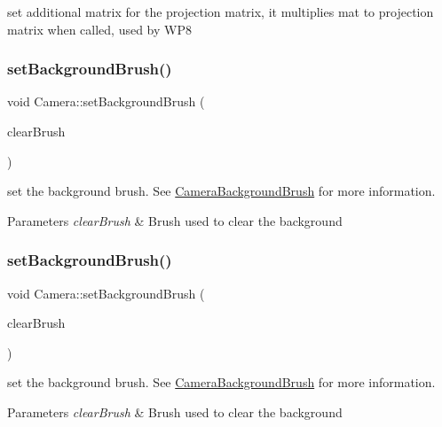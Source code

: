 set additional matrix for the projection matrix, it multiplies mat to projection matrix when called, used by W\+P8 \mbox{\label{classCamera_a1804790d419a1d952752f81680d98d1f}} 
\subsubsection{\texorpdfstring{set\+Background\+Brush()}{setBackgroundBrush()}\hspace{0.1cm}{\footnotesize\ttfamily [1/2]}}
{\footnotesize\ttfamily void Camera\+::set\+Background\+Brush (\begin{DoxyParamCaption}\item[{\hyperlink{classCameraBackgroundBrush}{Camera\+Background\+Brush} $\ast$}]{clear\+Brush }\end{DoxyParamCaption})}

set the background brush. See \hyperlink{classCameraBackgroundBrush}{Camera\+Background\+Brush} for more information. 
\begin{DoxyParams}{Parameters}
{\em clear\+Brush} & Brush used to clear the background \\
\hline
\end{DoxyParams}
\mbox{\label{classCamera_a1804790d419a1d952752f81680d98d1f}} 
\subsubsection{\texorpdfstring{set\+Background\+Brush()}{setBackgroundBrush()}\hspace{0.1cm}{\footnotesize\ttfamily [2/2]}}
{\footnotesize\ttfamily void Camera\+::set\+Background\+Brush (\begin{DoxyParamCaption}\item[{\hyperlink{classCameraBackgroundBrush}{Camera\+Background\+Brush} $\ast$}]{clear\+Brush }\end{DoxyParamCaption})}

set the background brush. See \hyperlink{classCameraBackgroundBrush}{Camera\+Background\+Brush} for more information. 
\begin{DoxyParams}{Parameters}
{\em clear\+Brush} & Brush used to clear the background \\
\hline
\end{DoxyParams}
\mbox{\label{classCamera_a361809c317aebb2785ffbda7836e25ff}} 

